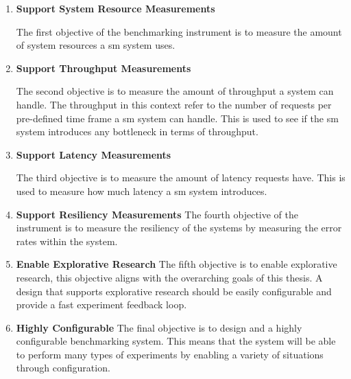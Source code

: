 \begin{enumerate}[label=\textbf{O\arabic*}, leftmargin=3\parindent]
    \item \textbf{Support System Resource Measurements}
    \label{o-1}
    
    The first objective of the benchmarking instrument is to measure the amount of system resources a \gls{sm} system uses.
    
    \item \textbf{Support Throughput Measurements}
    \label{o-2}
    
    The second objective is to measure the amount of throughput a system can handle. The throughput in this context refer to the number of requests per pre-defined time frame a \gls{sm} system can handle. This is used to see if the \gls{sm} system introduces any bottleneck in terms of throughput.

    \item \textbf{Support Latency Measurements}
    \label{o-3}
    
    The third objective is to measure the amount of latency requests have. This is used to measure how much latency a \gls{sm} system introduces.

    \item \textbf{Support Resiliency Measurements}
    \label{o-4}
    The fourth objective of the instrument is to measure the resiliency of the systems by measuring the error rates within the system.
    
    \item \textbf{Enable Explorative Research}
    \label{o-5}
    The fifth objective is to enable explorative research, this objective aligns with the overarching goals of this thesis. A design that supports explorative research should be easily configurable and provide a fast experiment feedback loop.
    
    \item \textbf{Highly Configurable}
    \label{o-6}
    The final objective is to design and a highly configurable benchmarking system. This means that the system will be able to perform many types of experiments by enabling a variety of situations through configuration.
    
\end{enumerate}
